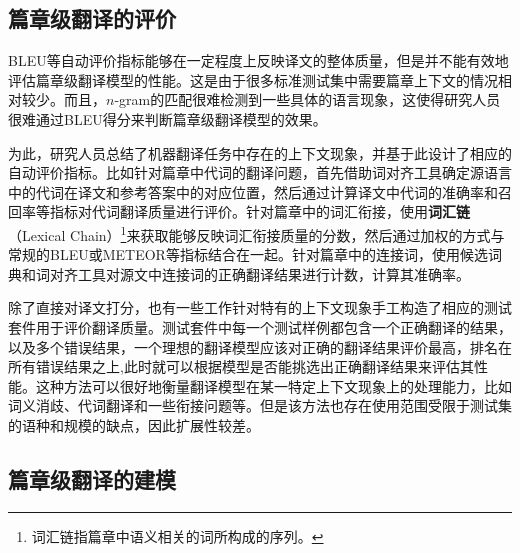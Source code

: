 
\subsection{篇章级翻译的评价}\label{sec:17-3-2}

\parinterval BLEU等自动评价指标能够在一定程度上反映译文的整体质量，但是并不能有效地评估篇章级翻译模型的性能。这是由于很多标准测试集中需要篇章上下文的情况相对较少。而且，$n$-gram的匹配很难检测到一些具体的语言现象，这使得研究人员很难通过BLEU得分来判断篇章级翻译模型的效果。

\parinterval 为此，研究人员总结了机器翻译任务中存在的上下文现象，并基于此设计了相应的自动评价指标。比如针对篇章中代词的翻译问题，首先借助词对齐工具确定源语言中的代词在译文和参考答案中的对应位置，然后通过计算译文中代词的准确率和召回率等指标对代词翻译质量进行评价。针对篇章中的词汇衔接，使用{\small\sffamily\bfseries{词汇链}}（Lexical Chain）\footnote{词汇链指篇章中语义相关的词所构成的序列。}来获取能够反映词汇衔接质量的分数，然后通过加权的方式与常规的BLEU或METEOR等指标结合在一起。针对篇章中的连接词，使用候选词典和词对齐工具对源文中连接词的正确翻译结果进行计数，计算其准确率。

\parinterval 除了直接对译文打分，也有一些工作针对特有的上下文现象手工构造了相应的测试套件用于评价翻译质量。测试套件中每一个测试样例都包含一个正确翻译的结果，以及多个错误结果，一个理想的翻译模型应该对正确的翻译结果评价最高，排名在所有错误结果之上,此时就可以根据模型是否能挑选出正确翻译结果来评估其性能。这种方法可以很好地衡量翻译模型在某一特定上下文现象上的处理能力，比如词义消歧、代词翻译和一些衔接问题等。但是该方法也存在使用范围受限于测试集的语种和规模的缺点，因此扩展性较差。


\subsection{篇章级翻译的建模}

